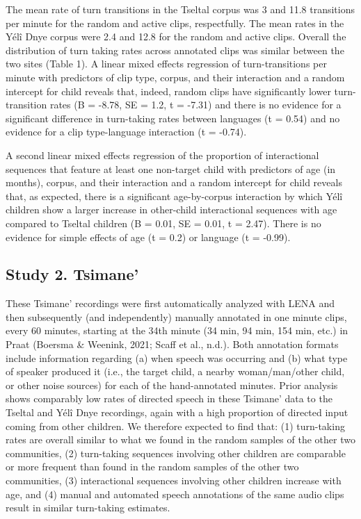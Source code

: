 \documentclass[10pt, letterpaper]{article}
\begin{document}
The mean rate of turn transitions in the Tseltal corpus was 3 and 11.8
transitions per minute for the random and active clips, respectfully.
The mean rates in the Yélî Dnye corpus were 2.4 and 12.8 for the random
and active clips. Overall the distribution of turn taking rates across
annotated clips was similar between the two sites (Table 1). A linear
mixed effects regression of turn-transitions per minute with predictors
of clip type, corpus, and their interaction and a random intercept for
child reveals that, indeed, random clips have significantly lower
turn-transition rates (B = -8.78, SE = 1.2, t = -7.31) and there is no
evidence for a significant difference in turn-taking rates between
languages (t = 0.54) and no evidence for a clip type-language
interaction (t = -0.74).

A second linear mixed effects regression of the proportion of
interactional sequences that feature at least one non-target child with
predictors of age (in months), corpus, and their interaction and a
random intercept for child reveals that, as expected, there is a
significant age-by-corpus interaction by which Yélî children show a
larger increase in other-child interactional sequences with age compared
to Tseltal children (B = 0.01, SE = 0.01, t = 2.47). There is no
evidence for simple effects of age (t = 0.2) or language (t = -0.99).

\hypertarget{study-2.-tsimane}{%
\subsection{Study 2. Tsimane'}\label{study-2.-tsimane}}

These Tsimane' recordings were first automatically analyzed with LENA
and then subsequently (and independently) manually annotated in one
minute clips, every 60 minutes, starting at the 34th minute (34 min, 94
min, 154 min, etc.) in Praat (Boersma \& Weenink, 2021; Scaff et al.,
n.d.). Both annotation formats include information regarding (a) when
speech was occurring and (b) what type of speaker produced it (i.e., the
target child, a nearby woman/man/other child, or other noise sources)
for each of the hand-annotated minutes. Prior analysis shows comparably
low rates of directed speech in these Tsimane' data to the Tseltal and
Yélî Dnye recordings, again with a high proportion of directed input
coming from other children. We therefore expected to find that: (1)
turn-taking rates are overall similar to what we found in the random
samples of the other two communities, (2) turn-taking sequences
involving other children are comparable or more frequent than found in
the random samples of the other two communities, (3) interactional
sequences involving other children increase with age, and (4) manual and
automated speech annotations of the same audio clips result in similar
turn-taking estimates.
\end{document}

